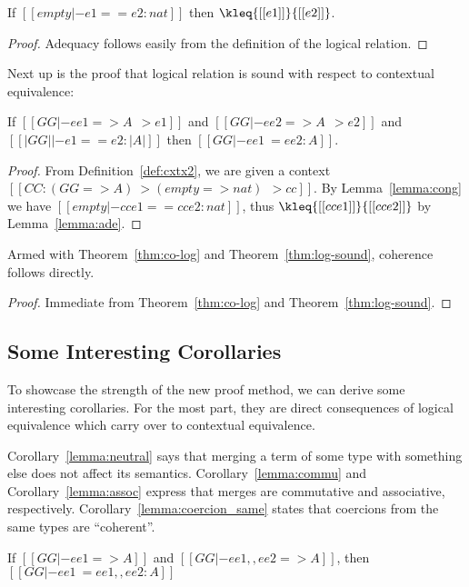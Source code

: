 \begin{lemma}[Adequacy] \label{lemma:ade}
  If $[[  empty |- e1 == e2 : nat ]]$ then $\kleq{[[e1]]}{[[e2]]}$.
\end{lemma}
\begin{proof}
  Adequacy follows easily from the definition of the logical relation.
\end{proof}


Next up is the proof that logical relation is sound with respect to contextual equivalence:
\begin{theorem} \label{thm:log-sound}
  If $[[ GG |- ee1 => A ~~> e1]]$ and $[[ GG |- ee2 => A ~~> e2]]$ and $  [[|GG| |- e1 == e2 : |A|]]  $ then
  $[[   GG |- ee1 ~= ee2 : A ]]$.
\end{theorem}
\begin{proof}
  From Definition~\ref{def:cxtx2}, we are given a context $[[  CC : (GG => A) ~> (empty => nat) ~~> cc ]]$. By Lemma~\ref{lemma:cong}
  we have $[[  empty |- cc{e1} == cc{e2} : nat  ]]$, thus $  \kleq{[[ cc{e1} ]]}{ [[cc{e2} ]]}    $ by Lemma~\ref{lemma:ade}.
\end{proof}


Armed with Theorem~\ref{thm:co-log} and Theorem~\ref{thm:log-sound}, coherence follows directly.
\coherence*
\begin{proof}
  Immediate from Theorem~\ref{thm:co-log} and Theorem~\ref{thm:log-sound}.
\end{proof}

\subsection{Some Interesting Corollaries}

To showcase the strength of the new proof method, we can derive some
interesting corollaries. For the most part, they are direct consequences of
logical equivalence which carry over to contextual equivalence.


Corollary~\ref{lemma:neutral} says that merging a term of some type with something else
does not affect its semantics. Corollary~\ref{lemma:commu} and Corollary~\ref{lemma:assoc} express that
merges are commutative and associative, respectively. Corollary~\ref{lemma:coercion_same}
states that coercions from the same types are ``coherent''.

\begin{corollary} \label{lemma:neutral}
  If $[[GG |- ee1 => A ]]$ and $[[GG |- ee1 ,, ee2 => A ]]$, then
  $[[GG |- ee1 ~= ee1 ,, ee2 : A]]$
\end{corollary}


